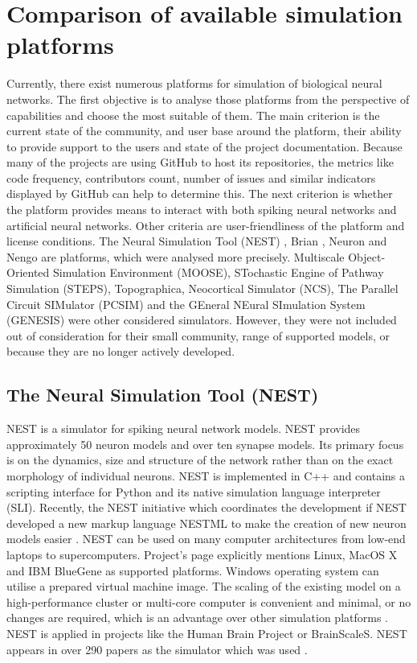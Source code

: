 \chapter{Comparison of available simulation platforms} \label{chap:03}

Currently, there exist numerous platforms for simulation of biological neural networks. The first objective is to analyse those platforms from the perspective of capabilities and choose the most suitable of them. The main criterion is the current state of the community, and user base around the platform, their ability to provide support to the users and state of the project documentation. Because many of the projects are using GitHub to host its repositories, the metrics like code frequency, contributors count, number of issues and similar indicators displayed by GitHub can help to determine this. The next criterion is whether the platform provides means to interact with both spiking neural networks and artificial neural networks. Other criteria are user-friendliness of the platform and license conditions. The Neural Simulation Tool (NEST) \cite{jordanNEST182019}, Brian \cite{stimbergBrianIntuitiveEfficient2019}, Neuron \cite{carnevaleNEURONBook06} and Nengo \cite{bekolayNengoPythonTool2014} are platforms, which were analysed more precisely. Multiscale Object-Oriented Simulation Environment (MOOSE), STochastic Engine of Pathway Simulation (STEPS), Topographica, Neocortical Simulator (NCS), The Parallel Circuit SIMulator (PCSIM) and the GEneral NEural SImulation System (GENESIS) were other considered simulators. However, they were not included out of consideration for their small community, range of supported models, or because they are no longer actively developed.

\section{The Neural Simulation Tool (NEST)}

NEST is a simulator for spiking neural network models. NEST provides approximately 50 neuron models and over ten synapse models. Its primary focus is on the dynamics, size and structure of the network rather than on the exact morphology of individual neurons. NEST is implemented in C++ and contains a scripting interface for Python and its native simulation language interpreter (SLI). Recently, the NEST initiative which coordinates the development if NEST developed a new markup language NESTML to make the creation of new neuron models easier \cite{plotnikovNESTMLModelingLanguage2016}.  NEST can be used on many computer architectures from low-end laptops to supercomputers. Project's page explicitly mentions Linux, MacOS X and IBM BlueGene as supported platforms. Windows operating system can utilise a prepared virtual machine image. The scaling of the existing model on a high-performance cluster or multi-core computer is convenient and minimal, or no changes are required, which is an advantage over other simulation platforms \cite{tikidji-hamburyanSoftwareBrainNetwork2017}. NEST is applied in projects like the Human Brain Project or BrainScaleS. NEST appears in over 290 papers as the simulator which was used \cite{julichaachenresearchallianceNESTNeuralSimulation2015}.


